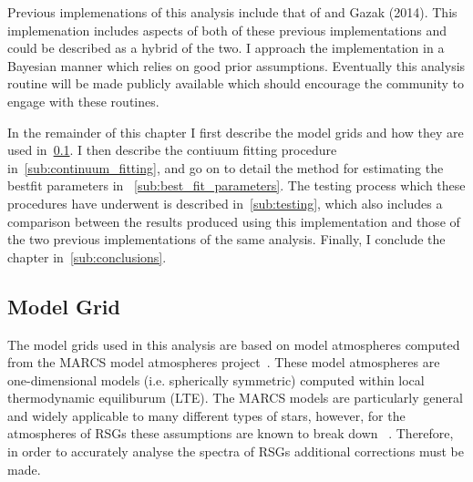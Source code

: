 \documentclass[12pt]{article}
\begin{document}
Previous implemenations of this analysis include that of
\cite{2010MNRAS.407.1203D} and Gazak (2014).
This implemenation includes aspects of both of these previous implementations and could be described as a hybrid of the two.
I approach the implementation in a Bayesian manner which relies on good prior assumptions.
Eventually this analysis routine will be made publicly available which should encourage the community to engage with these routines.

In the remainder of this chapter I first describe the model grids and how they are used in~\ref{sub:model_grid}.
I then describe the contiuum fitting procedure in~\ref{sub:continuum_fitting},
and go on to detail the method for estimating the bestfit parameters in
~\ref{sub:best_fit_parameters}.
The testing process which these procedures have underwent is described in~\ref{sub:testing}, which also includes a comparison between the results produced using this implementation and those of the two previous implementations of the same analysis.
Finally, I conclude the chapter in~\ref{sub:conclusions}.


\subsection{Model Grid} %
\label{sub:model_grid}
The model grids used in this analysis are based on model atmospheres computed from the
MARCS model atmospheres project~\citep{2008A&A...486..951G}.
These model atmospheres are one-dimensional models (i.e. spherically symmetric)
computed within local thermodynamic equiliburum (LTE).
The MARCS models are particularly general and widely applicable to many different types of stars,
however, for the atmospheres of RSGs these assumptions are known to break down
~\citep{2002AN....323..213F,2010ASPC..425..124P}.
Therefore, in order to accurately analyse the spectra of RSGs additional corrections must be made.
\end{document}
